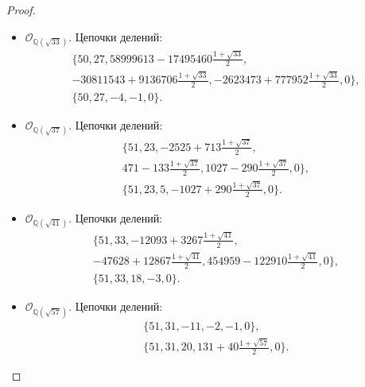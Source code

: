 \documentclass[_00_dissertation.tex]{subfiles}
\begin{document}
\begin{proof}
\begin{itemize}
        \item $\mathcal{O}_{\mathbb{Q}(\sqrt{33})}$.
        Цепочки делений:
        \begin{equation*}
            \begin{split}
                \{50, 27, 58999613-17495460\frac{1+\sqrt{33}}{2},\\
                    -30811543+9136706\frac{1+\sqrt{33}}{2}, -2623473+777952\frac{1+\sqrt{33}}{2}, 0\},\\
                \{50, 27, -4, -1, 0\}.
            \end{split}
        \end{equation*}
    
        \item $\mathcal{O}_{\mathbb{Q}(\sqrt{37})}$.
        Цепочки делений:
        \begin{equation*}
            \begin{split}
                \{51, 23, -2525+713\frac{1+\sqrt{37}}{2},\\
                    471-133\frac{1+\sqrt{37}}{2}, 1027-290\frac{1+\sqrt{37}}{2}, 0\},\\
                \{51, 23, 5, -1027+290\frac{1+\sqrt{37}}{2}, 0\}.
            \end{split}
        \end{equation*}
    
        \item $\mathcal{O}_{\mathbb{Q}(\sqrt{41})}$.
        Цепочки делений:
        \begin{equation*}
            \begin{split}
                \{51, 33, -12093+3267\frac{1+\sqrt{41}}{2},\\
                    -47628+12867\frac{1+\sqrt{41}}{2}, 454959-122910\frac{1+\sqrt{41}}{2}, 0\},\\
                \{51, 33, 18, -3, 0\}.
            \end{split}
        \end{equation*}
    
        \item $\mathcal{O}_{\mathbb{Q}(\sqrt{57})}$.
        Цепочки делений:
        \begin{equation*}
            \begin{split}
                \{51, 31, -11, -2, -1, 0\},\\
                \{51, 31, 20, 131+40\frac{1+\sqrt{57}}{2}, 0\}.
            \end{split}
        \end{equation*}
    

\end{itemize}
\end{proof}
\end{document}
